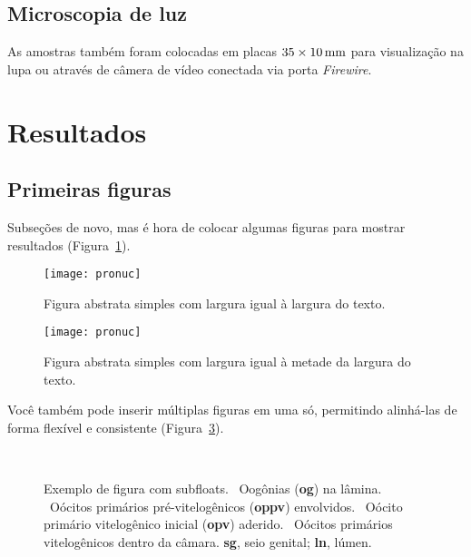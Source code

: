 \subsection{Microscopia de luz}\label{cap2:mem:micro}

As amostras também foram colocadas em placas $35\times\unit[10]{mm}$ para visualização na lupa ou através de câmera de vídeo conectada via porta \emph{Firewire}.

\section{Resultados}\label{cap2:res}

\subsection{Primeiras figuras}\label{cap2:res:figs}

Subseções de novo, mas é hora de colocar algumas figuras para mostrar resultados (Figura~\ref{fig:pronuc}).

\begin{figure}[htbp]
  \centering
  \texttt{[image: pronuc]}
  \caption[Figura simples]{Figura abstrata simples com largura igual à largura do texto.}
  \label{fig:pronuc}
\end{figure}

\begin{figure}[htbp]
  \centering
  \texttt{[image: pronuc]}
  \caption[Outra figura simples]{Figura abstrata simples com largura igual à metade da largura do texto.}
  \label{fig:pronuc2}
\end{figure}

Você também pode inserir múltiplas figuras em uma só, permitindo alinhá-las de forma flexível e consistente (Figura~\ref{fig:tufo}).

\begin{figure}[htbp]%
  \centering%
  \vspace{11pt}
  \\
  \vspace{-18pt}
  \vspace{11pt}
  \caption[Figura com subfloats]{Exemplo de figura com subfloats. ~Oogônias (\textbf{og}) na lâmina. ~Oócitos primários pré-vitelogênicos (\textbf{oppv}) envolvidos. ~Oócito primário vitelogênico inicial (\textbf{opv}) aderido. ~Oócitos primários vitelogênicos dentro da câmara. \textbf{sg}, seio genital; \textbf{ln}, lúmen.}%
  \label{fig:tufo}%
\end{figure}%

